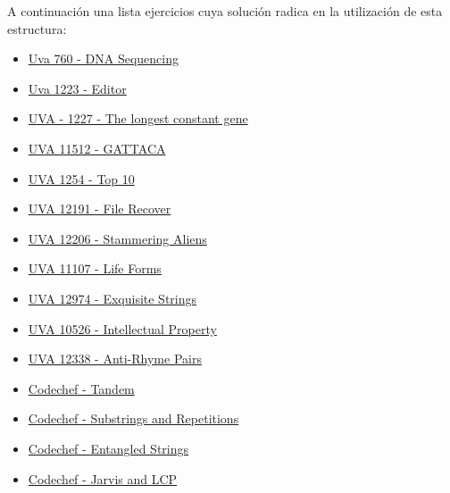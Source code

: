A continuación una lista ejercicios cuya solución radica en la utilización de esta estructura:

\begin{itemize}
	\item \href{http://uva.onlinejudge.org/index.php?option=com_onlinejudge&Itemid=8&category=24&page=show_problem&problem=701}{Uva 760 - DNA Sequencing}
	\item \href{http://uva.onlinejudge.org/index.php?option=com_onlinejudge&Itemid=8&category=24&page=show_problem&problem=3664}{Uva 1223 - Editor}
	\item \href{https://uva.onlinejudge.org/index.php?option=onlinejudge&page=show_problem&problem=3668}{UVA - 1227 - The longest constant gene}
	\item \href{https://uva.onlinejudge.org/index.php?option=com_onlinejudge&Itemid=8&page=show_problem&problem=2507}{UVA 11512 - GATTACA}
	\item \href{https://uva.onlinejudge.org/index.php?option=com_onlinejudge&Itemid=8&page=show_problem&problem=3695}{UVA 1254 - Top 10}
	\item \href{https://uva.onlinejudge.org/index.php?option=com_onlinejudge&Itemid=8&page=show_problem&problem=3343}{UVA 12191 - File Recover}
	\item \href{https://uva.onlinejudge.org/index.php?option=onlinejudge&page=show_problem&problem=3358}{UVA 12206 - Stammering Aliens}
	\item \href{https://uva.onlinejudge.org/index.php?option=com_onlinejudge&Itemid=8&page=show_problem&problem=2048}{UVA 11107 - Life Forms}
	\item \href{https://uva.onlinejudge.org/index.php?option=com_onlinejudge&Itemid=8&category=862&page=show_problem&problem=4853}{UVA 12974 - Exquisite Strings}
	\item \href{https://uva.onlinejudge.org/index.php?option=com_onlinejudge&Itemid=8&page=show_problem&problem=1467}{UVA 10526 - Intellectual Property}
	\item \href{https://uva.onlinejudge.org/index.php?option=onlinejudge&page=show_problem&problem=3760}{UVA 12338 - Anti-Rhyme Pairs}
	\item \href{https://www.codechef.com/problems/TANDEM}{Codechef - Tandem}
	\item \href{https://www.codechef.com/problems/ANUSAR}{Codechef - Substrings and Repetitions}
	\item \href{https://www.codechef.com/problems/TANGLED}{Codechef - Entangled Strings}
	\item \href{https://www.codechef.com/problems/INSQ16F}{Codechef - Jarvis and LCP}

\end{itemize}
